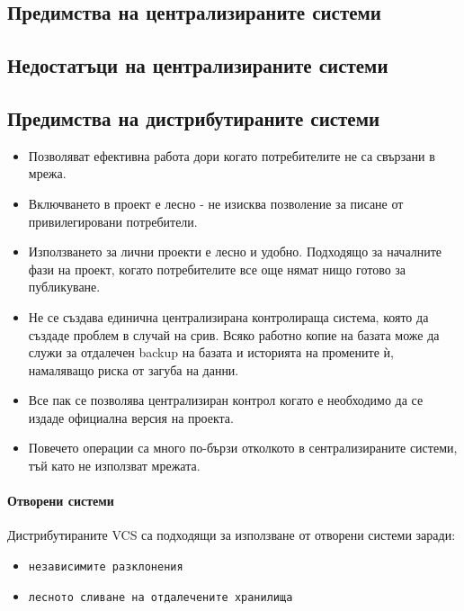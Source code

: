 \documentclass[a4paper]{article}
\begin{document}
  \vspace{10 pt}

  \subsection{Предимства на централизираните системи}

  \subsection{Недостатъци на централизираните системи}

  \subsection{Предимства на дистрибутираните системи}
    \begin{itemize}
      \item Позволяват ефективна работа дори когато потребителите не са свързани в мрежа.
      \item Включването в проект е лесно - не изисква позволение за писане от привилегировани потребители.
      \item Използването за лични проекти е лесно и удобно. Подходящо за началните фази на проект, когато потребителите все още нямат нищо готово за публикуване.
      \item Не се създава единична централизирана контролираща система, която да създаде проблем в случай на срив. Всяко работно копие на базата може да служи за отдалечен backup на базата и историята на промените ѝ, намаляващо риска от загуба на данни.
      \item Все пак се позволява централизиран контрол когато е необходимо да се издаде официална версия на проекта.
      \item Повечето операции са много по-бързи отколкото в сентрализираните системи, тъй като не използват мрежата.
    \end{itemize}

    \paragraph{Отворени системи}
      Дистрибутираните VCS са подходящи за използване от отворени системи заради:
      \begin{itemize}
        \item \texttt{независимите разклонения}
        \item \texttt{лесното сливане на отдалечените хранилища}
      \end{itemize}
\end{document}
